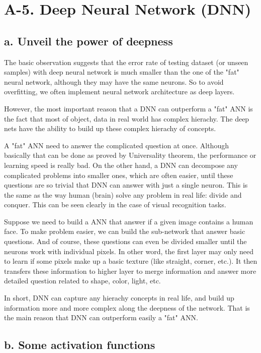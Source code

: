 \section*{A-5. Deep Neural Network (DNN)}

\subsection*{a. Unveil the power of deepness}

The basic observation suggests that the error rate of testing dataset (or unseen samples) with deep neural network is much smaller than the one of the "fat" neural network, although they may have the same neurons. So to avoid overfitting, we often implement neural network architecture as deep layers.

However, the most important reason that a DNN can outperform a "fat" ANN is the fact that most of object, data in real world has complex hierachy. The deep nets have the ability to build up these complex hierachy of concepts.

A "fat" ANN need to answer the complicated question at once. Although basically that can be done as proved by Universality theorem, the performance or learning speed is really bad. On the other hand, a DNN can decompose any complicated problems into smaller ones, which are often easier, until these questions are so trivial that DNN can answer with just a single neuron. This is the same as the way human (brain) solve any problem in real life: divide and conquer. This can be seen clearly in the case of visual recognition tasks.

Suppose we need to build a ANN that answer if a given image contains a human face. To make problem easier, we can build the sub-network that answer basic questions.  And of course, these questions can even be divided smaller until the neurons work with individual pixels. In other word, the first layer may only need to learn if some pixels make up a basic texture (like straight, corner, etc.). It then transfers these information to higher layer to merge information and answer more detailed question related to shape, color, light, etc.

In short, DNN can capture any hierachy concepts in real life, and build up information more and more complex along the deepness of the network. That is the main reason that DNN can outperform easily a "fat" ANN.

\subsection*{b. Some activation functions}

